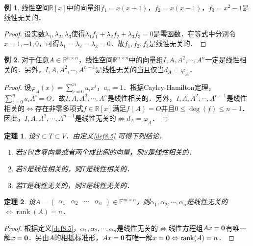\documentclass[a4paper,fontset=windows]{ctexbook}
\newtheorem{theorem}{定理}[chapter]
\theoremstyle{definition}
\newtheorem{example}{例}[chapter]
\DeclareMathOperator{\rank}{rank}
\renewcommand{\le}{\leqslant}
\begin{document}
\begin{example}
线性空间$\mathbb{R}[x]$中的向量组$f_1=x(x+1)$，$f_2=x(x-1)$，$f_3=x^2-1$是线性无关的．
\end{example}

\begin{proof}
设实数$\lambda_1,\lambda_2,\lambda_3$使得$\lambda_1f_1+\lambda_2f_2+\lambda_3f_3=0$是零函数．在等式中分别令$x=1,-1,0$，可得$\lambda_1=\lambda_2=\lambda_3=0$．故$f_1,f_2,f_3$是线性无关的．
\end{proof}

\begin{example}
对于任意$A\in\mathbb{R}^{n\times n}$，线性空间$\mathbb{R}^{n\times n}$中的向量组$I,A,A^2,\cdots,A^n$一定是线性相关的．另外，$I,A,A^2,\cdots,A^{n-1}$是线性无关的当且仅当$d_A=\varphi_A$．
\end{example}

\begin{proof}
设$\varphi_A(x)=\sum\limits_{i=0}^na_ix^i$，$a_n=1$．根据Cayley-Hamilton定理，$\sum\limits_{i=0}^na_iA^i=O$．故$I,A,A^2,\cdots,A^n$是线性相关的．另外，$I,A,A^2,\cdots,A^{n-1}$是线性相关的$\Leftrightarrow$存在非零多项式$f\in\mathbb{R}[x]$满足$f(A)=O$并且$0\le\deg(f)\le n-1$．因此，$I,A,A^2,\cdots,A^{n-1}$是线性无关的$\Leftrightarrow d_A=\varphi_A$．
\end{proof}

\begin{theorem}\label{thm8.2}
设$S\subset T\subset V$．由定义\ref{def8.5} 可得下列结论．
\begin{enumerate}
\item 若$S$包含零向量或者两个成比例的向量，则$S$是线性相关的．
\item 若$S$是线性相关的，则$T$是线性相关的．
\item 若$T$是线性无关的，则$S$是线性无关的．
\end{enumerate}
\end{theorem}

\begin{theorem}
设$A=\begin{pmatrix}\alpha_1&\alpha_2&\cdots&\alpha_n\end{pmatrix}\in\mathbb{F}^{m\times n}$，则$\alpha_1,\alpha_2,\cdots,\alpha_n$是线性无关的$\Leftrightarrow\rank(A)=n$．
\end{theorem}

\begin{proof}
根据定义\ref{def8.5}，$\alpha_1,\alpha_2,\cdots,\alpha_n$是线性无关的$\Leftrightarrow$线性方程组$Ax={\bf 0}$有唯一解$x={\bf 0}$．另由$A$的相抵标准形，$Ax={\bf 0}$有唯一解$x={\bf 0}\Leftrightarrow\rank(A)=n$．
\end{proof}
\end{document}
